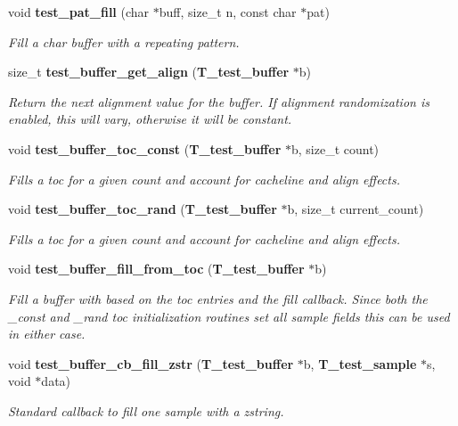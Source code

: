 \begin{CompactItemize}
void {\bf test\_\-pat\_\-fill} (char $\ast$buff, size\_\-t n, const char $\ast$pat)
\begin{CompactList}\small\item\em Fill a char buffer with a repeating pattern.\item\end{CompactList}\item 
size\_\-t {\bf test\_\-buffer\_\-get\_\-align} ({\bf T\_\-test\_\-buffer} $\ast$b)
\begin{CompactList}\small\item\em Return the next alignment value for the buffer. If alignment randomization is enabled, this will vary, otherwise it will be constant.\item\end{CompactList}\item 
void {\bf test\_\-buffer\_\-toc\_\-const} ({\bf T\_\-test\_\-buffer} $\ast$b, size\_\-t count)
\begin{CompactList}\small\item\em Fills a toc for a given count and account for cacheline and align effects.\item\end{CompactList}\item 
void {\bf test\_\-buffer\_\-toc\_\-rand} ({\bf T\_\-test\_\-buffer} $\ast$b, size\_\-t current\_\-count)
\begin{CompactList}\small\item\em Fills a toc for a given count and account for cacheline and align effects.\item\end{CompactList}\item 
void {\bf test\_\-buffer\_\-fill\_\-from\_\-toc} ({\bf T\_\-test\_\-buffer} $\ast$b)
\begin{CompactList}\small\item\em Fill a buffer with based on the toc entries and the fill callback. Since both the \_\-const and \_\-rand toc initialization routines set all sample fields this can be used in either case.\item\end{CompactList}\item 
void {\bf test\_\-buffer\_\-cb\_\-fill\_\-zstr} ({\bf T\_\-test\_\-buffer} $\ast$b, {\bf T\_\-test\_\-sample} $\ast$s, void $\ast$data)
\begin{CompactList}\small\item\em Standard callback to fill one sample with a zstring.\item\end{CompactList}\item 

\end{CompactItemize}
